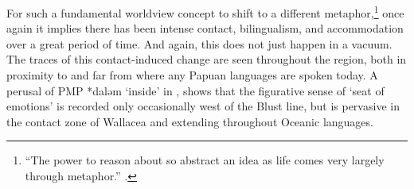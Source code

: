 For such a fundamental worldview concept to shift to a different
metaphor,\footnote{
		“The power to reason about so abstract an
		idea as life comes very largely through metaphor.”
		\citep[62]{LakoffTurner1989}.}
once again it implies there has been intense
contact, bilingualism, and accommodation over a great period of time.
And again, this does not just happen in a vacuum.
The traces of this contact-induced change are seen throughout
the region, both in proximity to
and far from where any Papuan languages are spoken today.
A perusal of PMP *daləm ‘inside’ in \citet{BlustTrussel2020},
shows that the figurative sense of ‘seat
of emotions’ is recorded only occasionally west of the Blust
line, but is pervasive in the contact zone of Wallacea
and extending throughout Oceanic languages.